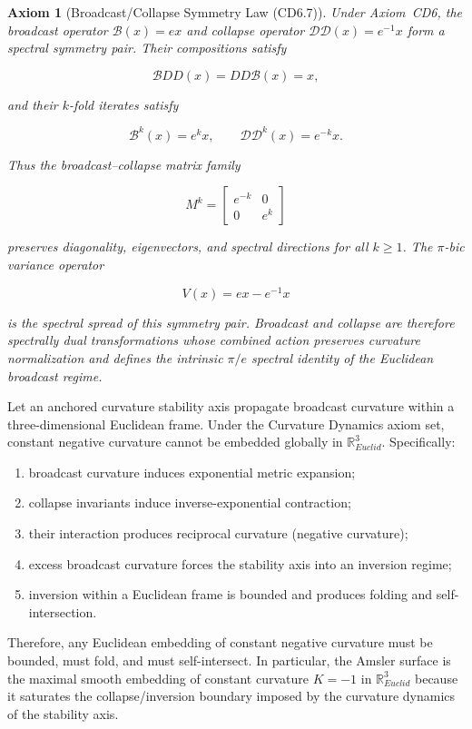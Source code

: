 \documentclass[final,onefignum,onetabnum]{siamart}
\newtheorem{axiom}{Axiom}
\begin{document}
\begin{axiom}[Broadcast/Collapse Symmetry Law (CD6.7)]
Under Axiom~CD6, the broadcast operator $\mathcal{B}(x)=e x$ and collapse operator $\mathcal{DD}(x)=e^{-1} x$ form a spectral symmetry pair. Their compositions satisfy


\[
\mathcal{B}DD(x) = DD\mathcal{B}(x) = x,
\]


and their $k$-fold iterates satisfy


\[
\mathcal{B}^{k}(x) = e^{k} x, \qquad \mathcal{DD}^{k}(x) = e^{-k} x.
\]


Thus the broadcast--collapse matrix family


\[
M^{k} =
\begin{bmatrix}
e^{-k} & 0 \\
0 & e^{k}
\end{bmatrix}
\]


preserves diagonality, eigenvectors, and spectral directions for all $k \ge 1$. The $\pi$-bic variance operator


\[
V(x) = e x - e^{-1} x
\]


is the spectral spread of this symmetry pair. Broadcast and collapse are therefore spectrally dual transformations whose combined action preserves curvature normalization and defines the intrinsic $\pi/e$ spectral identity of the Euclidean broadcast regime.
\end{axiom}

\begin{theorem}
Let an anchored curvature stability axis propagate broadcast curvature within a three-dimensional Euclidean frame. Under the Curvature Dynamics axiom set, constant negative curvature cannot be embedded globally in $\mathbb{R}_{Euclid}^3$. Specifically:

\begin{enumerate}
    \item broadcast curvature induces exponential metric expansion;
    \item collapse invariants induce inverse-exponential contraction;
    \item their interaction produces reciprocal curvature (negative curvature);
    \item excess broadcast curvature forces the stability axis into an inversion regime;
    \item inversion within a Euclidean frame is bounded and produces folding and self-intersection.
\end{enumerate}

Therefore, any Euclidean embedding of constant negative curvature must be bounded, must fold, and must self-intersect. In particular, the Amsler surface is the maximal smooth embedding of constant curvature $K=-1$ in $\mathbb{R}_{Euclid}^3$ because it saturates the collapse/inversion boundary imposed by the curvature dynamics of the stability axis.
\end{theorem}
\end{document}
